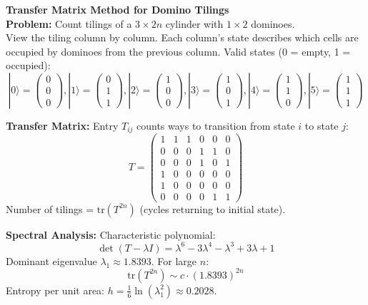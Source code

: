 \begin{technical}
{\Large\textbf{Transfer Matrix Method for Domino Tilings}}\\[0.7em]

\noindent\textbf{Problem:} Count tilings of a $3 \times 2n$ cylinder with $1 \times 2$ dominoes.\\[0.5em]
View the tiling column by column. Each column's state describes which cells are occupied by dominoes from the previous column. Valid states (0 = empty, 1 = occupied):
\[
|0\rangle = \begin{pmatrix}0\\0\\0\end{pmatrix}, 
|1\rangle = \begin{pmatrix}0\\1\\1\end{pmatrix},
|2\rangle = \begin{pmatrix}1\\0\\0\end{pmatrix},
|3\rangle = \begin{pmatrix}1\\0\\1\end{pmatrix},
|4\rangle = \begin{pmatrix}1\\1\\0\end{pmatrix},
|5\rangle = \begin{pmatrix}1\\1\\1\end{pmatrix}
\]

\noindent\textbf{Transfer Matrix:} Entry $T_{ij}$ counts ways to transition from state $i$ to state $j$:
\[
T = \begin{pmatrix}
1 & 1 & 1 & 0 & 0 & 0 \\
0 & 0 & 0 & 1 & 1 & 0 \\
0 & 0 & 0 & 1 & 0 & 1 \\
1 & 0 & 0 & 0 & 0 & 0 \\
1 & 0 & 0 & 0 & 0 & 0 \\
0 & 0 & 0 & 0 & 1 & 1
\end{pmatrix}
\]
Number of tilings = $\text{tr}(T^{2n})$ (cycles returning to initial state).

\noindent\textbf{Spectral Analysis:} Characteristic polynomial:
\[
\det(T - \lambda I) = \lambda^6 - 3\lambda^4 - \lambda^3 + 3\lambda + 1
\]
Dominant eigenvalue $\lambda_1 \approx 1.8393$. For large $n$:
\[
\text{tr}(T^{2n}) \sim c \cdot (1.8393)^{2n}
\]
Entropy per unit area: $h = \frac{1}{6}\ln(\lambda_1^2) \approx 0.2028$.


\end{technical}
